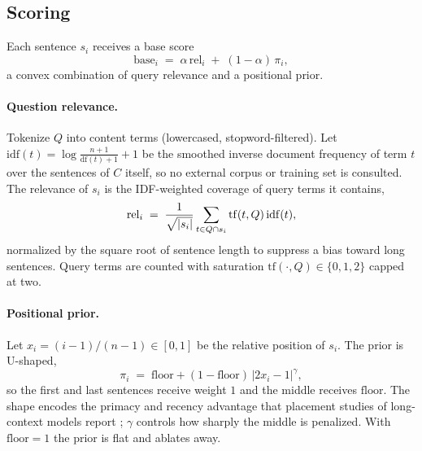 \documentclass[review,12pt]{elsarticle}
\DeclarePairedDelimiter\abs{\lvert}{\rvert}
\theoremstyle{remark}
\begin{document}
\subsection{Scoring}
Each sentence $s_i$ receives a base score
\begin{equation}
\label{eq:base}
\mathrm{base}_i \;=\; \alpha\,\mathrm{rel}_i \;+\; (1-\alpha)\,\pi_i,
\end{equation}
a convex combination of query relevance and a positional prior.

\paragraph{Question relevance.}
Tokenize $Q$ into content terms (lowercased, stopword-filtered). Let
$\mathrm{idf}(t)=\log\frac{n+1}{\mathrm{df}(t)+1}+1$ be the smoothed
inverse document frequency of term $t$ over the sentences of $C$
itself, so no external corpus or training set is consulted. The
relevance of $s_i$ is the IDF-weighted coverage of query terms it
contains,
\begin{equation}
\label{eq:rel}
\mathrm{rel}_i \;=\;
\frac{1}{\sqrt{\abs{s_i}}}\sum_{t \in Q \cap s_i}
\mathrm{tf}(t, Q)\,\mathrm{idf}(t),
\end{equation}
normalized by the square root of sentence length to suppress a bias
toward long sentences. Query terms are counted with saturation
$\mathrm{tf}(\cdot,Q) \in \{0, 1, 2\}$ capped at two.

\paragraph{Positional prior.}
Let $x_i = (i-1)/(n-1)\in[0,1]$ be the relative position of $s_i$. The
prior is U-shaped,
\begin{equation}
\label{eq:pos}
\pi_i \;=\; \mathrm{floor} + (1-\mathrm{floor})\,
\lvert 2x_i - 1\rvert^{\gamma},
\end{equation}
so the first and last sentences receive weight $1$ and the middle
receives $\mathrm{floor}$. The shape encodes the primacy and recency
advantage that placement studies of long-context models report
\citep{liu2023lost}; $\gamma$ controls how sharply the middle is
penalized. With $\mathrm{floor}=1$ the prior is flat and ablates away.
\end{document}

